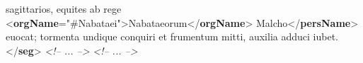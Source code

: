 \begin{shaded}
\hspace*{1em}\hspace*{1em}\hspace*{1em}\hspace*{1em}\hspace*{1em}\hspace*{1em} sagittarios, equites ab rege {<\textbf{orgName}\hspace*{1em}{ref}="{\#Nabataei}">}Nabataeorum{</\textbf{orgName}>}\mbox{}\newline 
\hspace*{1em}\hspace*{1em}\hspace*{1em}\hspace*{1em}\hspace*{1em}\hspace*{1em}Malcho{</\textbf{persName}>} euocat; tormenta undique conquiri et\mbox{}\newline 
\hspace*{1em}\hspace*{1em}\hspace*{1em}\hspace*{1em}\hspace*{1em}\hspace*{1em}\hspace*{1em}\hspace*{1em}\hspace*{1em}\hspace*{1em}\hspace*{1em}\hspace*{1em} frumentum mitti, auxilia adduci iubet.{</\textbf{seg}>}\mbox{}\newline 
\textit{<!-- ... -->}\mbox{}\newline 
\hspace*{1em}\hspace*{1em}\hspace*{1em}\hspace*{1em}\mbox{}\newline 
\textit{<!-- ... -->}\mbox{}\newline 
\hspace*{1em}\hspace*{1em}\hspace*{1em}\mbox{}\newline 

\end{shaded}
